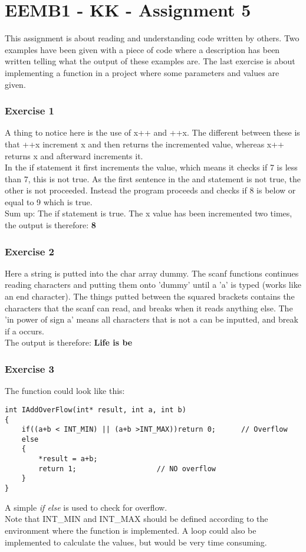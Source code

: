 

\part*{EEMB1 - KK - Assignment 5}
This assignment is about reading and understanding code written by others. Two examples have been given with a piece of code 
where a description has been written telling what the output of these examples are. 
The last exercise is about implementing a function in a  project where some parameters and values are given.
\section{Exercise 1}
A thing to notice here is the use of x++ and ++x. The different between these is that ++x increment x and then returns 
the incremented value, whereas x++ returns x and afterward increments it.\\
In the if statement it first increments the value, which means it checks if 7 is less than 7, this is not true. As the first sentence in the and 
statement is not true, the other is not proceeded. Instead the program proceeds and checks if 8 is below or equal to 9 which is true.\\
Sum up: The if statement is true. The x value has been incremented two times, the output is therefore: \textbf{8}
\section{Exercise 2}
Here a string is putted into the char array dummy. The scanf functions continues reading characters and putting them onto
'dummy' until a 'a' is typed (works like an end character). The things putted between the squared brackets contains the characters that the scanf can read, 
and breaks when it reads anything else. The 'in power of sign a' means all characters that is not a can be inputted, and break if a occurs.\\
The output is therefore: \textbf{Life is be}
\section{Exercise 3}
The function could look like this:
\begin{lstlisting}
int IAddOverFlow(int* result, int a, int b)
{			
	if((a+b < INT_MIN) || (a+b >INT_MAX))return 0;		// Overflow
	else
	{
		*result = a+b;
		return 1;					// NO overflow
	}
}
\end{lstlisting}
A simple \textit{if else} is used to check for overflow.\\
Note that INT\_MIN and INT\_MAX should be defined according to the environment where the function is implemented. 
A loop could also be implemented to calculate the values, but would be very time consuming.



